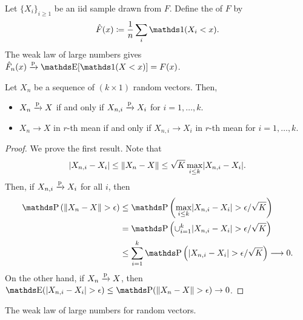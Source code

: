 \documentclass[letterpaper, 10pt]{article}
\begin{document}
\begin{example}
  Let \(\{X_i\}_{i \geq 1}\) be an iid sample drawn from \(F\).
  Define the  of \(F\) by
  \[
    \hat{F}(x) \coloneqq \frac{1}{n} \sum_i \ind(X_i < x).
  \]
  The weak law of large numbers gives \(\hat{F}_n(x) \probto \E[\ind(X < x)] = F(x)\).
\end{example}
\begin{proposition}
  Let \(X_n\) be a sequence of \((k \times 1)\) random vectors.
  Then,
  \begin{itemize}
    \item \(X_n \xrightarrow{\mathrm{p}} X\) if and only if \(X_{n, i} \xrightarrow{\mathrm{p}} X_i\) for \(i = 1, \dots, k\). 
    \item \(X_n \to X\) in \(r\)-th mean if and only if \(X_{n, i} \to X_i\) in \(r\)-th mean for \(i = 1, \dots, k\).
  \end{itemize}
\end{proposition}
\begin{proof}
  We prove the first result.
  Note that
  \[
    \lvert X_{n, i} - X_i\rvert \leq \lVert X_n - X\rVert \leq \sqrt{K} \max_{i \leq k} \lvert X_{n, i} - X_i\rvert.
  \]
  Then, if \(X_{n, i} \xrightarrow{\mathrm{p}} X_i\) for all \(i\), then
  \begin{align*}
    \P\left( \norm{X_n - X} > \epsilon \right)
    &\leq \P\left( \max_{i \leq k} \abs{X_{n, i} - X_i} > \epsilon / \sqrt{K} \right) \\
    &= \P\left( \cup_{i = 1}^k \abs{X_{n, i} - X_i} > \epsilon / \sqrt{K} \right) \\
    &\leq \sum_{i = 1}^k \P\left( \abs{X_{n, i} - X_i} > \epsilon / \sqrt{K} \right)
    \longrightarrow 0.
  \end{align*}
  On the other hand, if \(X_n \xrightarrow{\mathrm{p}} X\), then \(\E(\abs{X_{n, i} - X_i} > \epsilon) \leq \P(\norm{X_n - X} > \epsilon) \to 0\).
\end{proof}
\begin{corollary}
  The weak law of large numbers for random vectors.
\end{corollary}
\end{document}
